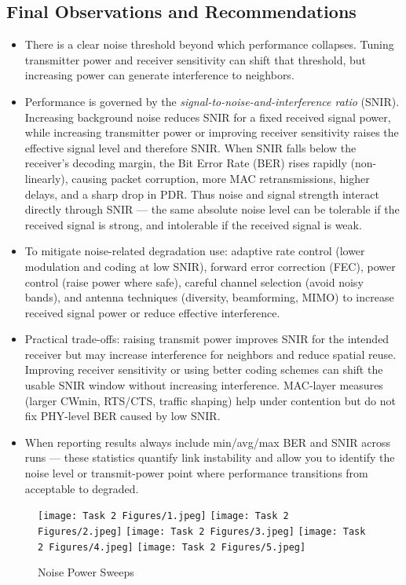 \documentclass{rapport}
\begin{document}
\subsection{Final Observations and Recommendations}
\begin{itemize}
  \item There is a clear noise threshold beyond which performance collapses. Tuning transmitter power and receiver sensitivity can shift that threshold, but increasing power can generate interference to neighbors.
  \item Performance is governed by the \emph{signal-to-noise-and-interference ratio} (SNIR). Increasing background noise reduces SNIR for a fixed received signal power, while increasing transmitter power or improving receiver sensitivity raises the effective signal level and therefore SNIR. When SNIR falls below the receiver's decoding margin, the Bit Error Rate (BER) rises rapidly (non-linearly), causing packet corruption, more MAC retransmissions, higher delays, and a sharp drop in PDR. Thus noise and signal strength interact directly through SNIR — the same absolute noise level can be tolerable if the received signal is strong, and intolerable if the received signal is weak.
  \item To mitigate noise-related degradation use: adaptive rate control (lower modulation and coding at low SNIR), forward error correction (FEC), power control (raise power where safe), careful channel selection (avoid noisy bands), and antenna techniques (diversity, beamforming, MIMO) to increase received signal power or reduce effective interference.
  \item Practical trade-offs: raising transmit power improves SNIR for the intended receiver but may increase interference for neighbors and reduce spatial reuse. Improving receiver sensitivity or using better coding schemes can shift the usable SNIR window without increasing interference. MAC-layer measures (larger CWmin, RTS/CTS, traffic shaping) help under contention but do not fix PHY-level BER caused by low SNIR.
  \item When reporting results always include min/avg/max BER and SNIR across runs — these statistics quantify link instability and allow you to identify the noise level or transmit-power point where performance transitions from acceptable to degraded.
\end{itemize}


\begin{figure}[H]
  \centering
  \texttt{[image: Task 2 Figures/1.jpeg]}
  \texttt{[image: Task 2 Figures/2.jpeg]}
  \texttt{[image: Task 2 Figures/3.jpeg]}
  \texttt{[image: Task 2 Figures/4.jpeg]}
  \texttt{[image: Task 2 Figures/5.jpeg]}
  \caption{Noise Power Sweeps}
  \label{fig:network_perf}
\end{figure}
\end{document}
